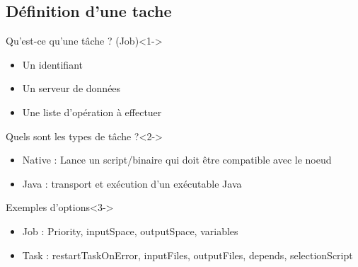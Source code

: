 \documentclass{beamer}
\begin{document}
\subsection{Définition d'une tache}
\begin{frame}
        \begin{block}{Qu'est-ce qu'une t\^ache ? (Job)}<1->
            \begin{itemize}
                \item Un identifiant
                \item Un serveur de données
                \item Une liste d'opération à effectuer %
            \end{itemize}
        \end{block}
        \begin{exampleblock}{Quels sont les types de t\^ache ?}<2->
            \begin{itemize}
                \item Native : Lance un script/binaire qui doit être compatible avec le noeud
                \item Java : transport et exécution d'un exécutable Java
            \end{itemize}
        \end{exampleblock}
        \begin{exampleblock}{Exemples d'options}<3->
            \begin{itemize}
                \item Job : Priority, inputSpace, outputSpace, variables
                \item Task : restartTaskOnError, inputFiles, outputFiles, depends, selectionScript
            \end{itemize}
        \end{exampleblock}
\end{frame}
\end{document}
